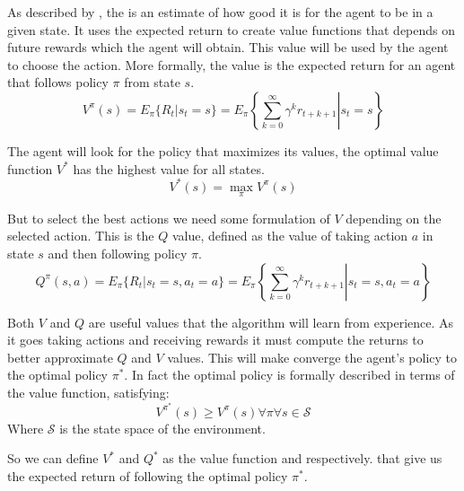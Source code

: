 As described by \citeauthor*[Section~3.7]{sutton1998introduction}, the  is an estimate of how good it is for the agent to be in a given state. It uses the expected return to create value functions that depends on future rewards which the agent will obtain. This value will be used by the agent to choose the action. More formally, the value is the expected return for an agent that follows policy $\pi$ from state $s$.
\begin{equation}
    V^\pi(s) = E_\pi \lbrace R_t | s_t = s \rbrace =
    E_\pi \left\{ \left. \sum_{k=0}^\infty \gamma^kr_{t+k+1} \right| s_t = s \right\}
\end{equation}

The agent will look for the policy that maximizes its values, the optimal value function $V^*$ has the highest value for all states.
\begin{equation}
    V^*(s)=\max_\pi V^\pi(s)
\end{equation}

But to select the best actions we need some formulation of $V$ depending on the selected action. This is the $Q$ value, defined as the value of taking action $a$ in state $s$ and then following policy $\pi$.
\begin{equation}
    Q^\pi(s, a) = E_\pi \lbrace R_t | s_t = s, a_t = a \rbrace =
    E_\pi \left\{ \left. \sum_{k=0}^\infty \gamma^kr_{t+k+1} \right| s_t = s, a_t = a \right\}
\end{equation}

Both $V$ and $Q$ are useful values that the algorithm will learn from experience. As it goes taking actions and receiving rewards it must compute the returns to better approximate $Q$ and $V$ values. This will make converge the agent’s policy to the optimal policy $\pi^*$. In fact the optimal policy is formally described in terms of the value function, satisfying:
\begin{equation}
    V^{\pi^*}(s)\geq V^{\pi}(s) \forall \pi \forall s \in \mathcal{S}
\end{equation}
Where $\mathcal{S}$ is the state space of the environment.

So we can define $V^*$ and $Q^*$ as the value function and  respectively.
that give us the expected return of following the optimal policy $\pi^*$.

